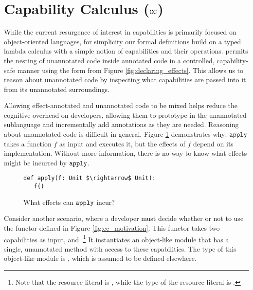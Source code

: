\section{Capability Calculus ($\mathtt{CC}$)}
\label{s:cc}

While the current resurgence of interest in capabilities is primarily focused on
object-oriented languages, for simplicity our formal definitions build on a typed
lambda calculus with a simple notion of capabilities and their operations. 
permits the nesting of unannotated code inside annotated code in a controlled,
capability-safe manner using the  form from Figure
\ref{fig:declaring_effects}. This allows us to reason about unannotated code
by inspecting what capabilities are passed into it from its unannotated
surroundings.

Allowing effect-annotated and unannotated code to be mixed helps
reduce the cognitive overhead on developers, allowing them to 
prototype in the unannotated sublanguage and incrementally add
annotations as they are needed. Reasoning about unannotated code is
difficult in general. Figure \ref{fig:unannotated_reasoning}
demonstrates why: $\mathtt{apply}$ takes a function $f$ as input and
executes it, but the effects of $f$ depend on its
implementation. Without more information, there is no way to know what
effects might be incurred by $\mathtt{apply}$.

\begin{figure}
\vspace*{-5mm}
\begin{lstlisting}
def apply(f: Unit $\rightarrow$ Unit):
   f()
\end{lstlisting}
\vspace*{-5mm}
\caption{What effects can $\mathtt{apply}$ incur?}
\vspace*{-5mm}
\label{fig:unannotated_reasoning}
\end{figure}

Consider another scenario, where a developer must decide whether or not
to use the  functor defined in Figure \ref{fig:cc_motivation}. This
functor takes two capabilities as input,  and .\footnote{Note that the resource literal is , while the type of the resource literal is
.} It instantiates an object-like module that has a single, unannotated  method with access to these capabilities. The type of this object-like module is , which is assumed to be defined elsewhere.

